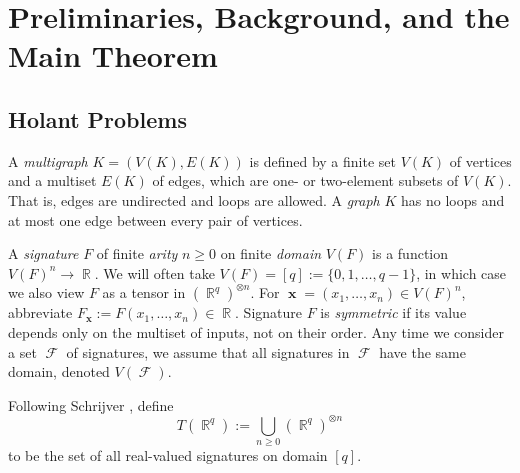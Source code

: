 \documentclass{theoretics}
\DeclareMathOperator{\rr}{\mathbb{R}}
\DeclareMathOperator{\vx}{\mathbf{x}}
\DeclareMathOperator{\fc}{\mathcal{F}}
\begin{document}
\section{Preliminaries, Background, and the Main Theorem}
\label{sec:preliminaries}
\subsection{Holant Problems}
\label{sec:holant}
A \emph{multigraph} $K = (V(K),E(K))$ is defined by a finite
set $V(K)$ of vertices and a multiset $E(K)$ of edges, 
which are one- or two-element subsets of 
$V(K)$. That is, edges are undirected and loops are allowed. A \emph{graph} $K$ has no
loops and at most one edge between every pair of vertices.

A \emph{signature} $F$ of finite \emph{arity} $n \geq 0$ on finite \emph{domain} $V(F)$ is a 
function $V(F)^n \to \rr$.
We will often take $V(F) = [q] := \{0,1,\ldots,q-1\}$, in which case we also view $F$ as a
tensor in $(\rr^q)^{\otimes n}$. For $\vx = (x_1,\ldots,x_n) \in V(F)^n$, abbreviate
$F_{\vx} := F(x_1,\ldots,x_n) \in \rr$. Signature $F$ is \emph{symmetric} if 
its value depends only on the multiset of inputs, not on their order.
Any time we consider a set $\fc$ of signatures,
we assume that all signatures in $\fc$ have the same domain, denoted $V(\fc)$. 
\begin{definition}[$T(\rr^q)$]
    Following Schrijver \cite{schrijver_tensor_2008}, define
    \[
        T(\rr^q) := \bigcup_{n \geq 0} (\rr^q)^{\otimes n}
    \]
    to be the set of all real-valued signatures on domain $[q]$.
\end{definition}
\end{document}
